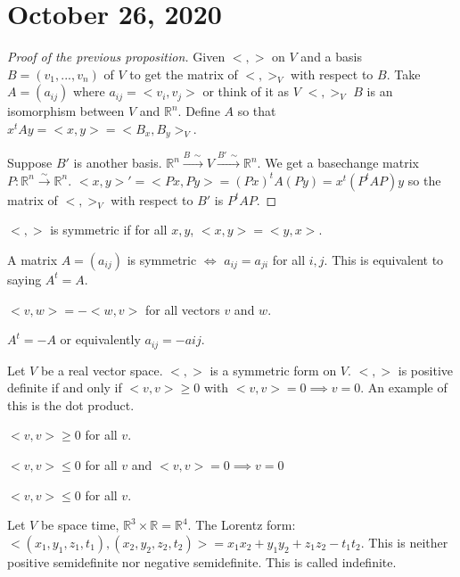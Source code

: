 \documentclass{article}
\newcommand{\R}{\mathbb{R}}
\newcommand{\ra}[1][]{\xrightarrow{#1}}
\begin{document}
\section{October 26, 2020}
\begin{proof}[Proof of the previous proposition]
Given $<,>$ on $V$ and a basis $B=(v_1,...,v_n)$ of $V$ to get the matrix of $<,>_V$ with respect to $B$. Take $A=(a_{ij})$ where $a_{ij}=<v_i,v_j>$ or think of it as $V$ $<,>_V$ $B$ is an isomorphism between $V$ and $\R^n$. Define $A$ so that $x^tAy=<x,y>=<B_x,B_y>_V$.

Suppose $B'$ is another basis. $\R^n\ra[B \, \sim]V\ra[B' \, \sim] \R^n$. We get a basechange matrix $P:\R^n\ra[\sim]\R^n$. $<x,y>'=<Px,Py>=(Px)^tA(Py)=x^t(P^tAP)y$ so the matrix of $<,>_V$ with respect to $B'$ is $P^tAP$.
\end{proof}
\begin{definition}
$<,>$ is symmetric if for all $x,y$, $<x,y>=<y,x>$.
\end{definition}
\begin{definition}
A matrix $A=(a_{ij})$ is symmetric $\iff$ $a_{ij}=a_{ji}$ for all $i,j$. This is equivalent to saying $A^t=A$.
\end{definition}
\begin{definition}
$<v,w>=-<w,v>$ for all vectors $v$ and $w$.
\end{definition}
\begin{definition}
$A^t=-A$ or equivalently $a_{ij}=-a{ij}$.
\end{definition}
\begin{definition}
Let $V$ be a real vector space. $<,>$ is a symmetric form on $V$. $<,>$ is positive definite if and only if $<v,v>\geq0$ with $<v,v>=0\implies v=0$. An example of this is the dot product.
\end{definition}
\begin{definition}
$<v,v>\geq 0$ for all $v$.
\end{definition}
\begin{definition}
$<v,v>\leq 0$ for all $v$ and $<v,v>=0\implies v=0$
\end{definition}
\begin{definition}
$<v,v>\leq 0$ for all $v$.
\end{definition}
\begin{example}
Let $V$ be space time, $\R^3\times \R=\R^4$. The Lorentz form: $<(x_1,y_1,z_1,t_1),(x_2,y_2,z_2,t_2)>=x_1x_2+y_1y_2+z_1z_2-t_1t_2$. This is neither positive semidefinite nor negative semidefinite. This is called indefinite.
\end{example}
\end{document}
